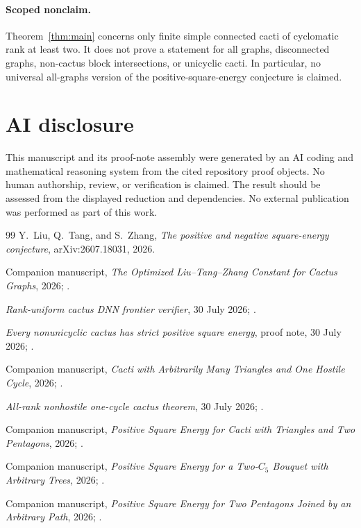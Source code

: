 \documentclass[11pt]{article}
\begin{document}
\paragraph{Scoped nonclaim.}
Theorem~\ref{thm:main} concerns only finite simple connected cacti of
cyclomatic rank at least two.  It does not prove a statement for all graphs,
disconnected graphs, non-cactus block intersections, or unicyclic cacti.  In
particular, no universal all-graphs version of the positive-square-energy
conjecture is claimed.

\section*{AI disclosure}
This manuscript and its proof-note assembly were generated by an AI coding and
mathematical reasoning system from the cited repository proof objects.  No
human authorship, review, or verification is claimed.  The result should be
assessed from the displayed reduction and dependencies.  No external
publication was performed as part of this work.

\begin{thebibliography}{99}
 Y.~Liu, Q.~Tang, and S.~Zhang,
\emph{The positive and negative square-energy conjecture}, arXiv:2607.18031,
2026.

 Companion manuscript, \emph{The Optimized Liu--Tang--Zhang
Constant for Cactus Graphs}, 2026; .

 \emph{Rank-uniform cactus DNN frontier verifier}, 30 July
2026; .

 \emph{Every nonunicyclic cactus has strict positive square
energy}, proof note, 30 July 2026;
.

 Companion manuscript, \emph{Cacti with Arbitrarily Many
Triangles and One Hostile Cycle}, 2026;
.

 \emph{All-rank nonhostile one-cycle cactus theorem},
30 July 2026;
.

 Companion manuscript, \emph{Positive Square Energy for Cacti
with Triangles and Two Pentagons}, 2026;
.

 Companion manuscript, \emph{Positive Square Energy for a
Two-$C_5$ Bouquet with Arbitrary Trees}, 2026;
.

 Companion manuscript, \emph{Positive Square Energy for
Two Pentagons Joined by an Arbitrary Path}, 2026;
.
\end{thebibliography}
\end{document}
